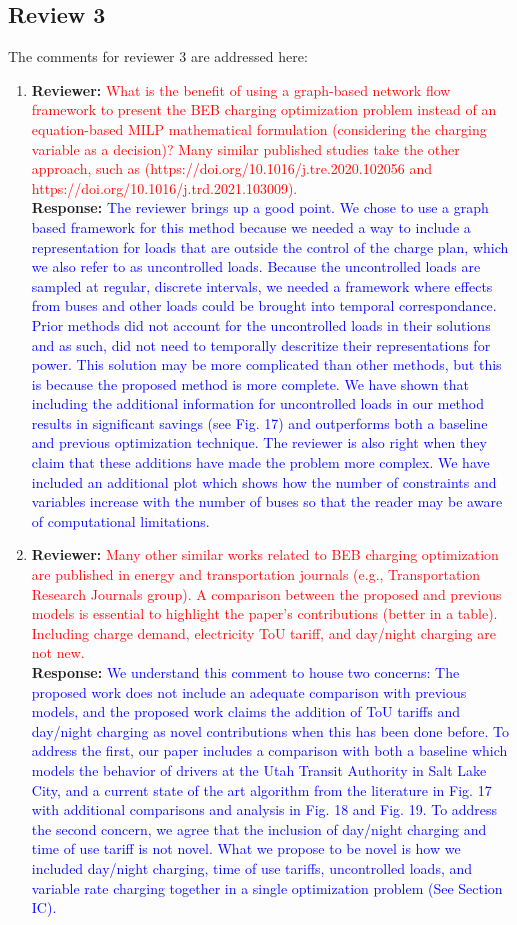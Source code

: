 \documentclass{article}
\newcommand\formatfeedback[2]
{%
	\textbf{Reviewer:} \textcolor{red}{#1} 
	\leavevmode\\[0.1in] \textbf{Response:} \textcolor{blue}{#2}
}
\begin{document}
\subsection*{Review 3}
The comments for reviewer 3 are addressed here:
\begin{enumerate}
	\item  \formatfeedback{What is the benefit of using a graph-based network flow framework to present the BEB charging
optimization problem instead of an equation-based MILP mathematical formulation (considering
the charging variable as a decision)? Many similar published studies take the other approach, such
as (https://doi.org/10.1016/j.tre.2020.102056 and https://doi.org/10.1016/j.trd.2021.103009).}{The reviewer brings up a good point. We chose to use a graph based framework for this method because we needed a way to include a representation for loads that are outside the control of the charge plan, which we also refer to as uncontrolled loads. Because the uncontrolled loads are sampled at regular, discrete intervals, we needed a framework where effects from buses and other loads could be brought into temporal correspondance. Prior methods did not account for the uncontrolled loads in their solutions and as such, did not need to temporally descritize their representations for power. This solution may be more complicated than other methods, but this is because the proposed method is more complete. We have shown that including the additional information for uncontrolled loads in our method results in significant savings (see Fig. 17) and outperforms both a baseline and previous optimization technique. The reviewer is also right when they claim that these additions have made the problem more complex. We have included an additional plot which shows how the number of constraints and variables increase with the number of buses so that the reader may be aware of computational limitations.} 
	\item \formatfeedback{Many other similar works related to BEB charging optimization are published in energy and
transportation journals (e.g., Transportation Research Journals group). A comparison between the
proposed and previous models is essential to highlight the paper’s contributions (better in a table).
Including charge demand, electricity ToU tariff, and day/night charging are not new.}{We understand this comment to house two concerns: The proposed work does not include an adequate comparison with previous models, and the proposed work claims the addition of ToU tariffs and day/night charging as novel contributions when this has been done before. To address the first, our paper includes a comparison with both a baseline which models the behavior of drivers at the Utah Transit Authority in Salt Lake City, and a current state of the art algorithm from the literature in Fig. 17 with additional comparisons and analysis in Fig. 18 and Fig. 19. To address the second concern, we agree that the inclusion of day/night charging and time of use tariff is not novel. What we propose to be novel is how we included day/night charging, time of use tariffs, uncontrolled loads, and variable rate charging together in a single optimization problem (See Section IC).} 

\end{enumerate}
\end{document}
